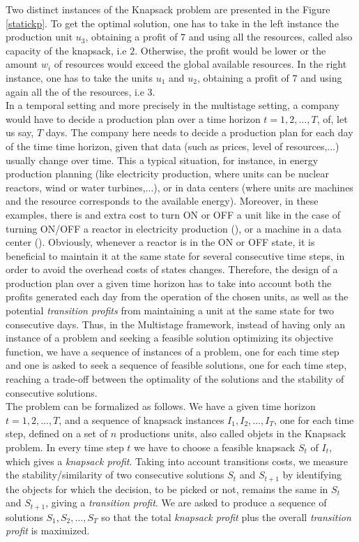 \documentclass[a4paper]{book}
\begin{document}
Two distinct instances of the {\sc Knapsack} problem are presented in the Figure \ref{statickp}. To get the optimal solution, one has to take in the left instance the production unit $u_3$, obtaining a profit of $7$ and using all the resources, called also capacity of the knapsack, i.e $2$. Otherwise, the profit would be lower or the amount $w_i$ of resources would exceed the global available resources. In the right instance, one has to take the units $u_1$ and $u_2$, obtaining a profit of $7$ and using again all the of the resources, i.e $3$.\\

In a temporal setting and more precisely in the multistage setting, a company would have to decide a production plan over a time horizon $t=1,2,\ldots, T$, of, let us say, $T$ days. The company here needs to decide a production plan for each day of the time time horizon, given that data (such as prices, level of resources,...) usually change over time. This a typical situation, for instance, in energy production planning (like electricity production, where units can be nuclear reactors, wind or water turbines,...), or in data centers (where units are machines and the resource corresponds to the available energy). Moreover, in these examples, there is and extra cost to turn ON or OFF a unit like in the case of turning ON/OFF a reactor in electricity production (\cite{rottner2018combinatorial}), or a machine in a data center (\cite{DBLP:conf/spaa/2017}). Obviously, whenever a reactor is in the ON or OFF state, it is beneficial to maintain it at the same state for several consecutive time steps, in order to avoid the overhead costs of states changes. Therefore, the design of a production plan over a given time horizon has to take into account both the profits generated each day from the operation of the chosen units, as well as the potential \textit{transition profits} from maintaining a unit at the same state for two consecutive days. Thus, in the {\sc Multistage} framework, instead of having only an instance of a problem and seeking a feasible solution optimizing its objective function, we have a sequence of instances of a problem, one for each time step and one is asked to seek a sequence of feasible solutions, one for each time step, reaching a trade-off between the optimality of the solutions and the stability of consecutive solutions.\\
The problem can be formalized as follows. We have a given time horizon $t=1,2,\ldots,T$, and a sequence of knapsack instances $I_1, I_2, \ldots,I_T$, one for each time step, defined on a set of $n$ productions units, also called objets in the {\sc Knapsack} problem. In every time step $t$ we have to choose a feasible knapsack $S_t$ of $I_t$, which gives a \textit{knapsack profit}. Taking into account transitions costs, we measure the stability/similarity of two consecutive solutions $S_t$ and $S_{t+1}$ by identifying the objects for which the decision, to be picked or not, remains the same in $S_t$ and $S_{t+1}$, giving a \textit{transition profit}. We are asked to produce a sequence of solutions $S_1, S_2, \ldots, S_T$ so that the total \textit{knapsack profit} plus the overall \textit{transition profit} is maximized.\\
\end{document}
